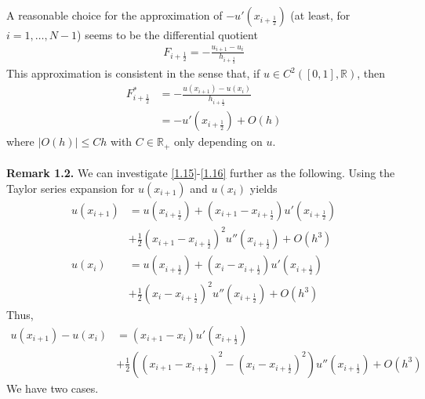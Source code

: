 \documentclass[a4paper]{article}
\numberwithin{equation}{section}
\begin{document}
A reasonable choice for the approximation of $- {u'}\left( {{x_{i + \frac{1}{2}}}} \right)$ (at least, for $i=1,\ldots,N-1$) seems to be the differential quotient
\begin{align}
{F_{i + \frac{1}{2}}} =  - \frac{{{u_{i + 1}} - {u_i}}}{{{h_{i + \frac{1}{2}}}}}
\end{align}
This approximation is consistent in the sense that, if $u \in {C^2}\left( {\left[ {0,1} \right],\mathbb{R}} \right)$, then
\begin{align}
\label{1.15}
F_{i + \frac{1}{2}}^* &=  - \frac{{u\left( {{x_{i + 1}}} \right) - u\left( {{x_i}} \right)}}{{{h_{i + \frac{1}{2}}}}}\\
 &=  - {u'}\left( {{x_{i + \frac{1}{2}}}} \right) + O\left( h \right) \label{1.16}
\end{align}
where $\left| {O\left( h \right)} \right| \le Ch$ with $C \in {\mathbb{R}_ + }$ only depending on $u$.\\
\\
\textbf{Remark 1.2.} We can investigate \eqref{1.15}-\eqref{1.16} further as the following. Using the Taylor series expansion for $u\left(x_{i+1}\right)$ and $u\left(x_i\right)$ yields
\begin{align}
u\left( {{x_{i + 1}}} \right) &= u\left( {{x_{i + \frac{1}{2}}}} \right) + \left( {{x_{i + 1}} - {x_{i + \frac{1}{2}}}} \right)u'\left( {{x_{i + \frac{1}{2}}}} \right) \\
&+ \frac{1}{2}{\left( {{x_{i + 1}} - {x_{i + \frac{1}{2}}}} \right)^2}u''\left( {{x_{i + \frac{1}{2}}}} \right) + O\left( {{h^3}} \right)\\
u\left( {{x_i}} \right) &= u\left( {{x_{i + \frac{1}{2}}}} \right) + \left( {{x_i} - {x_{i + \frac{1}{2}}}} \right)u'\left( {{x_{i + \frac{1}{2}}}} \right) \\
&+ \frac{1}{2}{\left( {{x_i} - {x_{i + \frac{1}{2}}}} \right)^2}u''\left( {{x_{i + \frac{1}{2}}}} \right) + O\left( {{h^3}} \right)
\end{align}
Thus,
\begin{align}
u\left( {{x_{i + 1}}} \right) - u\left( {{x_i}} \right) &= \left( {{x_{i + 1}} - {x_i}} \right)u'\left( {{x_{i + \frac{1}{2}}}} \right)\\
& + \frac{1}{2}\left( {{{\left( {{x_{i + 1}} - {x_{i + \frac{1}{2}}}} \right)}^2} - {{\left( {{x_i} - {x_{i + \frac{1}{2}}}} \right)}^2}} \right)u''\left( {{x_{i + \frac{1}{2}}}} \right) + O\left( {{h^3}} \right)
\end{align}
We have two cases.
\end{document}
